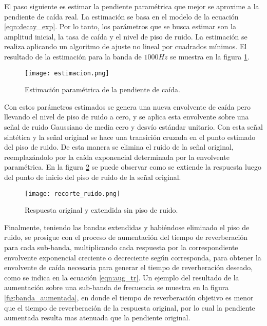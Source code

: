 El paso siguiente es estimar la pendiente paramétrica que mejor se aproxime a la pendiente de caída real. La estimación se basa en el modelo de la ecuación \ref{eqn:decay_exp}. Por lo tanto, los parámetros que se busca estimar son la amplitud inicial, la tasa de caída y el nivel de piso de ruido. La estimación se realiza aplicando un algoritmo de ajuste no lineal por cuadrados mínimos. El resultado de la estimación para la banda de $1000 Hz$ se muestra en la figura  \ref{fig:estimacion_parametrica}.

\begin{figure}[H]
	\centering{}
	\texttt{[image: estimacion.png]}
	\caption{Estimación paramétrica de la pendiente de caída.}
	\label{fig:estimacion_parametrica}
\end{figure}

Con estos parámetros estimados se genera una nueva envolvente de caída pero llevando el nivel de piso de ruido a cero, y se aplica esta envolvente sobre una señal de ruido Gaussiano de media cero y desvío estándar unitario. Con esta señal sintética y la señal original se hace una transición cruzada en el punto estimado del piso de ruido. De esta manera se elimina el ruido de la señal original, reemplazándolo por la caída exponencial determinada por la envolvente paramétrica.  En la figura \ref{fig:recorte_ruido} se puede observar como se extiende la respuesta luego del punto de inicio del piso de ruido de la señal original.

\begin{figure}[H]
	\centering{}
	\texttt{[image: recorte\_ruido.png]}
	\caption{Respuesta original y extendida sin piso de ruido.}
	\label{fig:recorte_ruido}
\end{figure}
  
Finalmente, teniendo las bandas extendidas y habiéndose eliminado el piso de ruido, se prosigue con el proceso de aumentación del tiempo de reverberación para cada sub-banda, multiplicando cada respuesta por la correspondiente envolvente exponencial creciente o decreciente según corresponda, para obtener la envolvente de caída necesaria para generar el tiempo de reverberación deseado, como se indica en la ecuación \ref{eqn:aug_tr}. Un ejemplo del resultado de la aumentación sobre una sub-banda de frecuencia se muestra en la figura \ref{fig:banda_aumentada}, en donde el tiempo de reverberación objetivo es menor que el tiempo de reverberación de la respuesta original, por lo cual la pendiente aumentada resulta mas atenuada que la pendiente original. 

